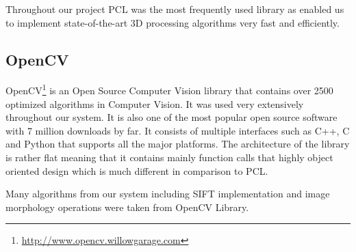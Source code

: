 Throughout our project PCL was the most frequently used library as enabled us to implement state-of-the-art 3D processing algorithms very fast and efficiently.  

\subsection{OpenCV}
OpenCV\footnote{\url{http://www.opencv.willowgarage.com}} is an Open Source Computer Vision library that contains over 2500 optimized algorithms in Computer Vision. It was used very extensively throughout our system. It is also one of the most popular open source software with 7 million downloads by far. It consists of multiple interfaces such as C++, C and Python that supports all the major platforms. The architecture of the library is rather flat meaning that it contains mainly function calls that highly object oriented design which is much different in comparison to PCL.

Many algorithms from our system including SIFT implementation and image morphology operations were taken from OpenCV Library. 








